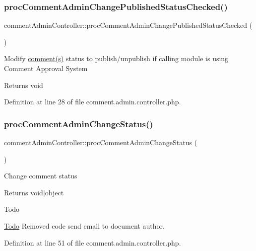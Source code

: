 \subsubsection{\texorpdfstring{proc\+Comment\+Admin\+Change\+Published\+Status\+Checked()}{procCommentAdminChangePublishedStatusChecked()}}
{\footnotesize\ttfamily comment\+Admin\+Controller\+::proc\+Comment\+Admin\+Change\+Published\+Status\+Checked (\begin{DoxyParamCaption}{ }\end{DoxyParamCaption})}

Modify \hyperlink{classcomment}{comment(s)} status to publish/unpublish if calling module is using Comment Approval System \begin{DoxyReturn}{Returns}
void 
\end{DoxyReturn}


Definition at line 28 of file comment.\+admin.\+controller.\+php.

\mbox{\label{classcommentAdminController_a70bde7bc9124b72df7bdf6bf09633148}} 
\subsubsection{\texorpdfstring{proc\+Comment\+Admin\+Change\+Status()}{procCommentAdminChangeStatus()}}
{\footnotesize\ttfamily comment\+Admin\+Controller\+::proc\+Comment\+Admin\+Change\+Status (\begin{DoxyParamCaption}{ }\end{DoxyParamCaption})}

Change comment status \begin{DoxyReturn}{Returns}
void$\vert$object 
\end{DoxyReturn}
\begin{DoxyRefDesc}{Todo}
\item[\hyperlink{todo__todo000005}{Todo}]Removed code send email to document author. \end{DoxyRefDesc}


Definition at line 51 of file comment.\+admin.\+controller.\+php.

\mbox{\label{classcommentAdminController_ad62c47962884acf8b3a862f075b31343}} 
